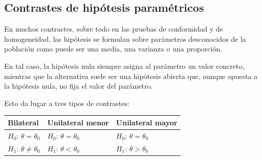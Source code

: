 \documentclass[
  spanish,
  a4paper,
]{scrreport}
\newcounter{none} %
\theoremstyle{plain}
\theoremstyle{definition}
\theoremstyle{definition}
\theoremstyle{remark}
\begin{document}
\subsection{Contrastes de hipótesis
paramétricos}\label{contrastes-de-hipuxf3tesis-paramuxe9tricos-1}

En muchos contrastes, sobre todo en las pruebas de conformidad y de
homogeneidad, las hipótesis se formulan sobre parámetros desconocidos de
la población como puede ser una media, una varianza o una proporción.

En tal caso, la hipótesis nula siempre asigna al parámetro un valor
concreto, mientras que la alternativa suele ser una hipótesis abierta
que, aunque opuesta a la hipótesis nula, no fija el valor del parámetro.

Esto da lugar a tres tipos de contrastes:

{\def\LTcaptype{none} %
\begin{longtable}[]{@{}
  >{\centering\arraybackslash}p{}
  >{\centering\arraybackslash}p{}
  >{\raggedright\arraybackslash}p{}@{}}
\toprule\noalign{}
\begin{minipage}[b]{\linewidth}\centering
Bilateral
\end{minipage} & \begin{minipage}[b]{\linewidth}\centering
Unilateral menor
\end{minipage} & \begin{minipage}[b]{\linewidth}\raggedright
Unilateral mayor
\end{minipage} \\
\midrule\noalign{}
\endhead
\bottomrule\noalign{}
\endlastfoot
\(H_0\): \(\theta = \theta_0\) & \(H_0\): \(\theta = \theta_0\) &
\(H_0\): \(\theta = \theta_0\) \\
\(H_1\): \(\theta \neq \theta_0\) & \(H_1\): \(\theta < \theta_0\) &
\(H_1\): \(\theta > \theta_0\) \\
\end{longtable}
}
\end{document}
